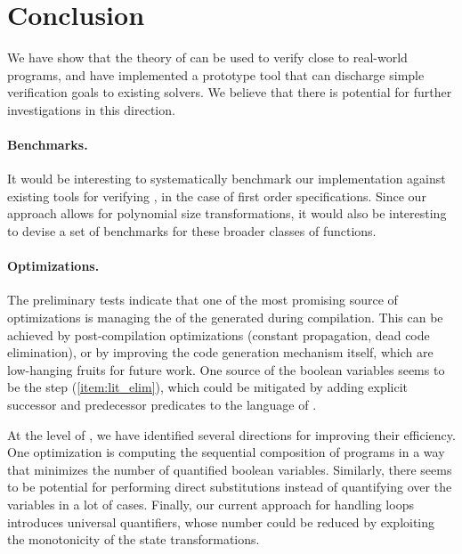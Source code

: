 \section{Conclusion}
\label{sec:conclusion}

We have show that the theory of  can be
used to verify close to real-world programs, and have implemented a prototype
tool that can discharge simple verification goals to existing solvers. We
believe that there is potential for further investigations in this direction.

\paragraph{Benchmarks.} It would be interesting to systematically benchmark our
implementation against existing tools for verifying , in the case of first order specifications. Since our approach
allows for polynomial size transformations, it would also be interesting to
devise a set of benchmarks for these broader classes of functions.

\paragraph{Optimizations.} The preliminary tests indicate that one of the most
promising source of optimizations is managing the  of the
generated  during compilation. This can be achieved by
post-compilation optimizations (constant propagation, dead code elimination),
or by improving the code generation mechanism itself, which are low-hanging
fruits for future work. One source of the boolean variables seems to be the
 step (\ref{item:lit_elim}), which could be
mitigated by adding explicit successor and predecessor predicates to the
language of .

At the level of , we have identified several
directions for improving their efficiency. One optimization is computing the
sequential composition of programs in a way that minimizes the number of
quantified boolean variables. Similarly, there seems to be potential for
performing direct substitutions instead of quantifying over the variables in a
lot of cases. Finally, our current approach for handling loops introduces
universal quantifiers, whose number could be reduced by exploiting the
monotonicity of the state transformations.
    
